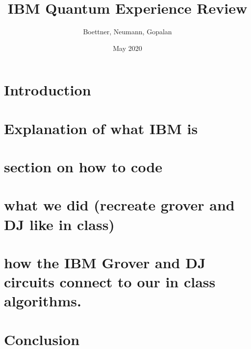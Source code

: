 \documentclass{article}
\title{IBM Quantum Experience Review}
\author{Boettner, Neumann, Gopalan }
\date{May 2020}
\begin{document}
\maketitle

\section{Introduction}
\section{Explanation of what IBM is}
\section{section on how to code}
\section{what we did (recreate grover and DJ like in class)}
\section{how the IBM Grover and DJ circuits connect to our in class algorithms.}
\section{Conclusion}
\end{document}
